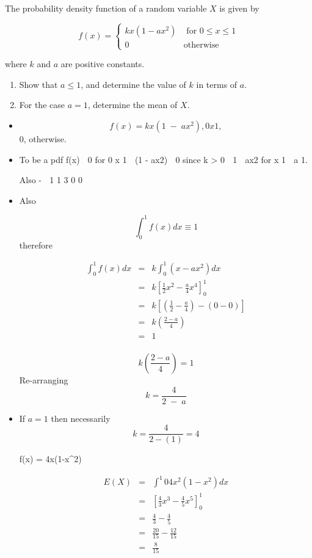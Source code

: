 \documentclass[a4paper,12pt]{article}
\begin{document}
\item The probability density function of a random variable $X$ is given by

\[ f(x) = \begin{cases} kx(1-ax^2) & \mbox{ for } 0 \leq x \leq 1 \\
0 & \mbox{otherwise}
\end{cases}
\]

where $k$ and $a$ are positive constants.
\begin{enumerate}
\item Show that $a \leq 1$, and determine the value of $k$ in terms of $a$. 
\item For the case $a = 1$, determine the mean of $X$. 
\end{enumerate}


\begin{itemize}
    \item 

\[f(x) = kx(1 \;-\; ax^2), 0 
 x 
 1,\]
0, otherwise.
\item To be a pdf f(x)  0 for 0 
 x 
 1  (1 \;-\; ax2)  0 since k > 0
 1  ax2 for x 
 1  a 
 1.

Also \;-\; 
1 1 3
0 0
\item 
Also

\[ \int^{1}_{0} f ( x ) dx \equiv 1\] therefore 

\begin{eqnarray*}
\int^{1}_{0} f ( x ) dx &=&  k \int^{1}_{0} ( x - ax^2) dx \\ 
&=& k \left[ \frac{1}{2}x^2 - \frac{a}{4}x^4\right]^{1}_{0} \\
&=& k \left[ \left( \frac{1}{2} - \frac{a}{4} \right) - \left( 0 - 0 \right) \right] \\
&=& k \left( \frac{2-a}{4} \right) \\
&=& 1 \\
\end{eqnarray*}
 
\[  k \left( \frac{2-a}{4} \right) = 1 \]
Re-arranging \[ k = \frac{4}{2 \;-\; a} \]

\item 
If $a=1$ then necessarily \[ k = \frac{4}{2-(1)} = 4\]

f(x) = 4x(1-x^2)

\begin{eqnarray*}
E(X) &=& \int^{1}{0} 4x^2(1-x^2) dx \\
&=& \left[ \frac{4}{3}x^3 - \frac{4}{5}x^5 \right]^{1}_{0}\\
&=&  \frac{4}{3} -  \frac{4}{5}\\
&=&  \frac{20}{15} -  \frac{12}{15}\\
&=& \frac{8}{15}\\
\end{eqnarray*}
\end{itemize}
\end{document}
